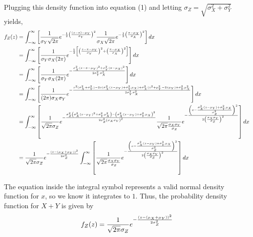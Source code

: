 \documentclass[12pt]{article}
\begin{document}
Plugging this density function into equation (1) and letting $\sigma_Z = \sqrt{\sigma_X^2 + \sigma_Y^2}$ yields,
\begin{align*}
f_Z(z) &= \int_{-\infty}^{\infty} \left[\frac{1}{\sigma_Y\sqrt{2\pi}} e^{-\frac{1}{2}\left(\frac{(z-x)-\mu_Y}{\sigma_Y}\right)^2} \frac{1}{\sigma_X\sqrt{2\pi}} e^{-\frac{1}{2}\left(\frac{x-\mu_X}{\sigma_X}\right)^2}\right] dx\\
&= \int_{-\infty}^{\infty} \left[\frac{1}{\sigma_Y\sigma_X(2\pi)} e^{-\frac{1}{2}\left[\left(\frac{z-x-\mu_Y}{\sigma_Y}\right)^2 + \left(\frac{x-\mu_X}{\sigma_X}\right)^2 \right]} \right] dx\\
&= \int_{-\infty}^{\infty} \left[\frac{1}{\sigma_Y\sigma_X(2\pi)} e^{-\frac{\sigma_X^2(z-x-\mu_Y)^2 + \sigma_Y^2(x-\mu_X)^2}{2 \sigma_Y^2 \sigma_X^2}} \right] dx\\
&= \int_{-\infty}^\infty \left[\frac{1}{(2\pi)\sigma_X\sigma_Y} e^{
      -\frac
         {
            x^2(\sigma_X^2 + \sigma_Y^2) - 
            2x(\sigma_X^2(z - \mu_Y) + \sigma_Y^2\mu_X) +
            \sigma_X^2(z^2 + \mu_Y^2 - 2z\mu_Y) + \sigma_Y^2\mu_X^2
         }
         {2\sigma_Y^2\sigma_X^2}}\right] dx\\
&= \int_{-\infty}^\infty
   \left[ \frac{1}{\sqrt{2\pi}\sigma_Z}
    e^{-\frac
         {
            \sigma_Z^2\left(\sigma_X^2(z - \mu_Y)^2 + \sigma_Y^2\mu_X^2\right) -
            \left(\sigma_X^2(z - \mu_Y) + \sigma_Y^2\mu_X\right)^2
         }
         {2\sigma_Z^2\left(\sigma_X\sigma_Y\right)^2}}
   \frac{1}{\sqrt{2\pi}\frac{\sigma_X\sigma_Y}{\sigma_Z}}
    e^{-\frac
         {
            \left(x - \frac{\sigma_X^2(z - \mu_Y) + \sigma_Y^2\mu_X}{\sigma_Z^2}\right)^2
         }
         {2\left(\frac{\sigma_X\sigma_Y}{\sigma_Z}\right)^2}} \right]
    dx \\
&= \frac{1}{\sqrt{2\pi}\sigma_Z}
   e^{- { (z-(\mu_X+\mu_Y))^2 \over 2\sigma_Z^2 }}
   \int_{-\infty}^{\infty} \left[
   \frac{1}{\sqrt{2\pi}\frac{\sigma_X\sigma_Y}{\sigma_Z}}
   e^{- \frac{\left(x-\frac{\sigma_X^2(z-\mu_Y)+\sigma_Y^2\mu_X}{\sigma_Z^2}\right)^2}{2\left(\frac{\sigma_X\sigma_Y}{\sigma_Z}\right)^2}} \right]
    dx
\end{align*}

The equation inside the integral symbol represents a valid normal density function for $x$, so we know it integrates to $1$. Thus, the probability density function for $X + Y$ is given by
\begin{align*}
f_Z(z) = \frac{1}{\sqrt{2\pi}\sigma_Z}
   e^{- { (z-(\mu_X+\mu_Y))^2 \over 2\sigma_Z^2 }}
\end{align*}
\end{document}
